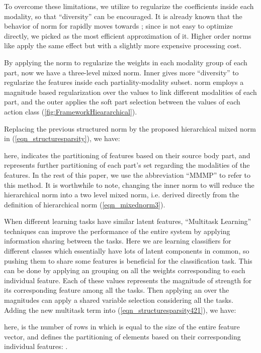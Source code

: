 \documentclass[9pt,technote,compsoc]{IEEEtran}
\begin{document}
To overcome these limitations, we utilize  to regularize the coefficients inside each modality, so that ``diversity'' \cite{Kowalski2009303} can be encouraged. It is already known that the behavior of  norm for  rapidly moves towards  \cite{5948411}; since  is not easy to optimize directly, we picked  as the most efficient approximation of it. Higher order norms like  apply the same effect but with a slightly more expensive processing cost. 


By applying the  norm to regularize the weights in each modality group of each part, now we have a three-level  mixed norm. Inner  gives more ``diversity''  to regularize the features inside each partiality-modality subset.  norm employs a magnitude based regularization over the  values to link different modalities of each part, and the outer  applies the soft part selection between the  values of each action class (\figurename{\ref{fig:FrameworkHieararchical}}).


Replacing the previous structured norm by the proposed hierarchical mixed norm in (\ref{eqn_structuresparsity}), we have:

here,  indicates the partitioning of features based on their source body part, and  represents further partitioning of each part's set regarding the modalities of the features. In the rest of this paper, we use the abbreviation ``MMMP'' to refer to this method. It is worthwhile to note, changing the inner norm to  will reduce the hierarchical norm into a two level mixed norm, i.e.   derived directly from the definition of hierarchical norm (\ref{eqn_mixednorm3}).

When different learning tasks have similar latent features, ``Multitask Learning'' \cite{multitask1997} techniques can improve the performance of the entire system by applying information sharing between the tasks. Here we are learning classifiers for  different classes which essentially have lots of latent components in common, so pushing them to share some features is beneficial for the classification task. This can be done by applying an  grouping on all the weights corresponding to each individual feature. Each of these  values represents the magnitude of strength for its corresponding feature among all the tasks. Then applying an  over the magnitudes can apply a shared variable selection considering all the tasks. Adding the new multitask term into (\ref{eqn_structuresparsity421}), we have:

here,  is the number of rows in  which is equal to the size of the entire feature vector, and  defines the partitioning of  elements based on their corresponding individual features: 
.
\end{document}
